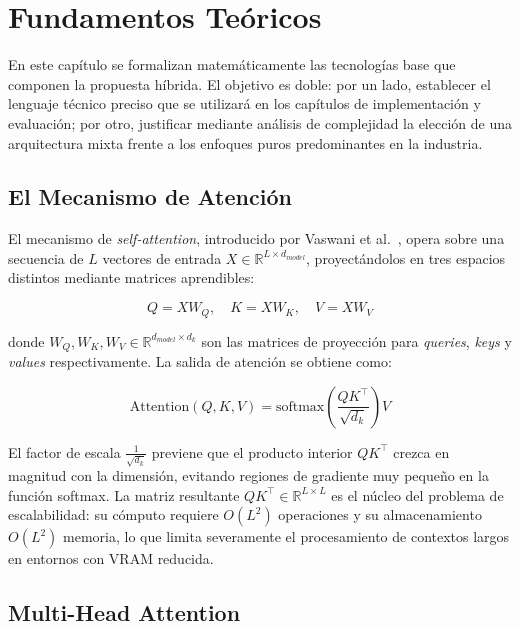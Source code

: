 \section{Fundamentos Teóricos}
\label{sec:fundamentos}

En este capítulo se formalizan matemáticamente las tecnologías base que componen la propuesta híbrida. El objetivo es doble: por un lado, establecer el lenguaje técnico preciso que se utilizará en los capítulos de implementación y evaluación; por otro, justificar mediante análisis de complejidad la elección de una arquitectura mixta frente a los enfoques puros predominantes en la industria.

\subsection{El Mecanismo de Atención}

El mecanismo de \textit{self-attention}, introducido por Vaswani et al.~\cite{vaswani2017attention}, opera sobre una secuencia de $L$ vectores de entrada $X \in \mathbb{R}^{L \times d_{model}}$, proyectándolos en tres espacios distintos mediante matrices aprendibles:

\begin{equation}
    Q = X W_Q, \quad K = X W_K, \quad V = X W_V
\end{equation}

donde $W_Q, W_K, W_V \in \mathbb{R}^{d_{model} \times d_k}$ son las matrices de proyección para \textit{queries}, \textit{keys} y \textit{values} respectivamente. La salida de atención se obtiene como:

\begin{equation}
    \text{Attention}(Q, K, V) = \text{softmax}\!\left(\frac{QK^\top}{\sqrt{d_k}}\right) V
\end{equation}

El factor de escala $\frac{1}{\sqrt{d_k}}$ previene que el producto interior $QK^\top$ crezca en magnitud con la dimensión, evitando regiones de gradiente muy pequeño en la función softmax. La matriz resultante $QK^\top \in \mathbb{R}^{L \times L}$ es el núcleo del problema de escalabilidad: su cómputo requiere $O(L^2)$ operaciones y su almacenamiento $O(L^2)$ memoria, lo que limita severamente el procesamiento de contextos largos en entornos con VRAM reducida.

\subsection{Multi-Head Attention}

